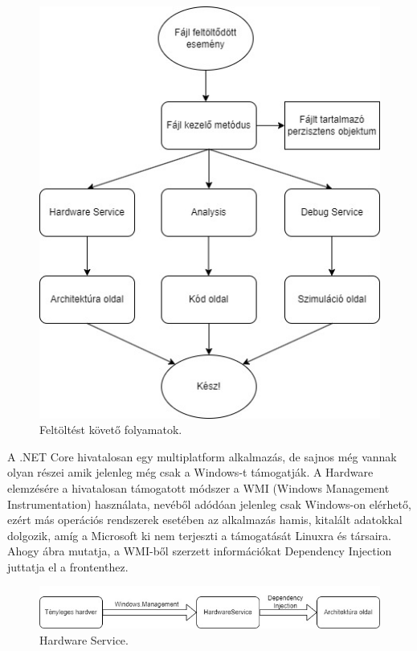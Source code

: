 \begin{figure}[h]
\centering
\includegraphics[scale=0.5]{images/UploadFlow.jpg}
\caption{Feltöltést követő folyamatok.}
\label{fig:up}
\end{figure}

A .NET Core hivatalosan egy multiplatform alkalmazás, de sajnos még vannak olyan részei amik jelenleg még csak a Windows-t támogatják. A Hardware elemzésére a hivatalosan támogatott módszer a WMI (Windows Management Instrumentation) használata, nevéből adódóan jelenleg csak Windows-on elérhető, ezért más operációs rendszerek esetében az alkalmazás hamis, kitalált adatokkal dolgozik, amíg a Microsoft ki nem terjeszti a támogatását Linuxra és társaira. Ahogy  ábra mutatja, a WMI-ből szerzett információkat Dependency Injection juttatja el a frontenthez.

\begin{figure}[h]
\centering
\includegraphics[scale=0.5]{images/HWS.jpg}
\caption{Hardware Service.}
\label{fig:hws}
\end{figure}

